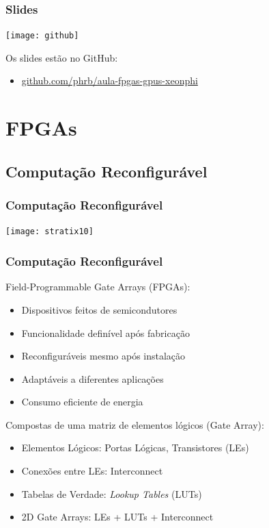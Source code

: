 \documentclass[10pt, compress]{beamer}
\begin{document}
\begin{frame}
    \frametitle{Slides}
    \begin{center}
        \texttt{[image: github]}
    \end{center}
    Os slides estão no \alert{GitHub}:

    \begin{itemize}
        \item \url{github.com/phrb/aula-fpgas-gpus-xeonphi}
    \end{itemize}
\end{frame}

\section{FPGAs}

\subsection{Computação Reconfigurável}

\begin{frame}
    \frametitle{Computação Reconfigurável}
    \begin{center}
        \texttt{[image: stratix10]}
    \end{center}
\end{frame}

\begin{frame}
    \frametitle{Computação Reconfigurável}
    \alert{Field-Programmable} Gate Arrays (FPGAs):

    \begin{itemize}
        \item Dispositivos feitos de semicondutores
        \item Funcionalidade definível após fabricação
        \item \alert{Reconfiguráveis} mesmo após instalação
        \item Adaptáveis a diferentes aplicações
        \item \alert{Consumo eficiente de energia}
    \end{itemize}

    \pause
    Compostas de uma matriz de elementos lógicos (\alert{Gate Array}):

    \begin{itemize}
        \item Elementos Lógicos: Portas Lógicas, Transistores (\alert{LEs})
        \item Conexões entre LEs: \alert{Interconnect}
        \item Tabelas de Verdade: \textit{Lookup Tables} (\alert{LUTs})
        \item 2D Gate Arrays: \alert{LEs} + \alert{LUTs} + \alert{Interconnect}
    \end{itemize}
\end{frame}
\end{document}
